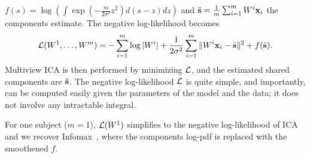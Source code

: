 \documentclass[12pt]{report}
\begin{document}
$
    f(s)= \log \left(\int \exp(-\frac{m}{2\sigma^2} z^2) d(s-z) dz\right)
$
and $\tilde{\mathbf{s}} = \frac1m\sum_{i=1}^m W^i\mathbf{x}_i$ the components estimate.
The negative log-likelihood becomes
\begin{equation}
    \label{eq:cost_function}
    \mathcal{L}(W^1, \dots, W^m) = -\sum_{i=1}^m \log|W^i| + \frac1{2\sigma^2}\sum_{i=1}^m\|W^i\mathbf{x}_i - \tilde{\mathbf{s}}\|^2 + f(\tilde{\mathbf{s}}).
\end{equation}
Multiview ICA is then performed by minimizing $\mathcal{L}$, and the estimated shared components are $\tilde{\mathbf{s}}$.
The negative log-likelihood $\mathcal{L}$ is quite simple, and importantly, can be computed easily given the parameters of the model and the data; it does not involve any intractable integral.
%

For one subject ($m=1$), $\mathcal{L}(W^1)$ simplifies to the negative log-likelihood of ICA and we recover Infomax~\cite{bell1995information,cardoso1997infomax}, where the components log-pdf is replaced with the smoothened $f$.
%
\end{document}
